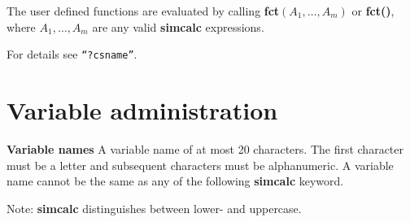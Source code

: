 \leer\leer
The user defined functions are evaluated by calling {\bf fct$(A_1,\ldots,A_m)$}
or {\bf fct()}, where \linebreak
{\bf $A_1,\ldots,A_m$} are any valid {\bf simcalc} expressions.

For details see {\tt ``?csname''}.


\newpage


\section{Variable administration}
\leer
{\bf Variable names}
\leer
A variable name  of at most 20 characters. The first character must be
a letter and subsequent characters must be alphanumeric. A variable name cannot be
the same as any of the following {\bf simcalc} keyword. 

Note: {\bf simcalc} distinguishes between lower- and uppercase.


